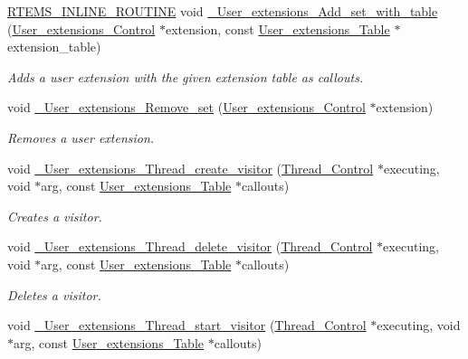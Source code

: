 \begin{DoxyCompactItemize}
\mbox{\hyperlink{group__RTEMSScoreBaseDefs_gac216239df231d5dbd15e3520b0b9313f}{R\+T\+E\+M\+S\+\_\+\+I\+N\+L\+I\+N\+E\+\_\+\+R\+O\+U\+T\+I\+NE}} void \mbox{\hyperlink{group__RTEMSScoreUserExt_gaa59ba5ba0d79eb8b04a9987c5323b29a}{\+\_\+\+User\+\_\+extensions\+\_\+\+Add\+\_\+set\+\_\+with\+\_\+table}} (\mbox{\hyperlink{structUser__extensions__Control}{User\+\_\+extensions\+\_\+\+Control}} $\ast$extension, const \mbox{\hyperlink{structUser__extensions__Table}{User\+\_\+extensions\+\_\+\+Table}} $\ast$extension\+\_\+table)
\begin{DoxyCompactList}\small\item\em Adds a user extension with the given extension table as callouts. \end{DoxyCompactList}\item 
void \mbox{\hyperlink{group__RTEMSScoreUserExt_ga20b95995efceaae7454b6bfbf4d9cf94}{\+\_\+\+User\+\_\+extensions\+\_\+\+Remove\+\_\+set}} (\mbox{\hyperlink{structUser__extensions__Control}{User\+\_\+extensions\+\_\+\+Control}} $\ast$extension)
\begin{DoxyCompactList}\small\item\em Removes a user extension. \end{DoxyCompactList}\item 
void \mbox{\hyperlink{group__RTEMSScoreUserExt_ga01a5e998ca8f18fa00f3082d71333dcb}{\+\_\+\+User\+\_\+extensions\+\_\+\+Thread\+\_\+create\+\_\+visitor}} (\mbox{\hyperlink{struct__Thread__Control}{Thread\+\_\+\+Control}} $\ast$executing, void $\ast$arg, const \mbox{\hyperlink{structUser__extensions__Table}{User\+\_\+extensions\+\_\+\+Table}} $\ast$callouts)
\begin{DoxyCompactList}\small\item\em Creates a visitor. \end{DoxyCompactList}\item 
void \mbox{\hyperlink{group__RTEMSScoreUserExt_ga047c9fc100da2ddf9baf9aacc79c306d}{\+\_\+\+User\+\_\+extensions\+\_\+\+Thread\+\_\+delete\+\_\+visitor}} (\mbox{\hyperlink{struct__Thread__Control}{Thread\+\_\+\+Control}} $\ast$executing, void $\ast$arg, const \mbox{\hyperlink{structUser__extensions__Table}{User\+\_\+extensions\+\_\+\+Table}} $\ast$callouts)
\begin{DoxyCompactList}\small\item\em Deletes a visitor. \end{DoxyCompactList}\item 
void \mbox{\hyperlink{group__RTEMSScoreUserExt_ga0dfb0797d5b69d1d9b178083722f145c}{\+\_\+\+User\+\_\+extensions\+\_\+\+Thread\+\_\+start\+\_\+visitor}} (\mbox{\hyperlink{struct__Thread__Control}{Thread\+\_\+\+Control}} $\ast$executing, void $\ast$arg, const \mbox{\hyperlink{structUser__extensions__Table}{User\+\_\+extensions\+\_\+\+Table}} $\ast$callouts)

\end{DoxyCompactItemize}
